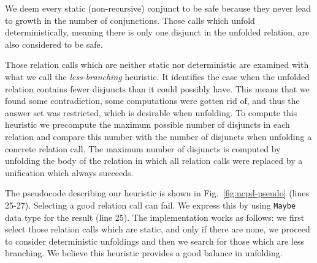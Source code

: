 We deem every static (non-recursive) conjunct to be safe because they never lead to growth in the number of conjunctions.
Those calls which unfold deterministically, meaning there is only one disjunct in the unfolded relation, are also considered to be safe.

Those relation calls which are neither static nor deterministic are examined with what we call the \emph{less-branching} heuristic.
It identifies the case when the unfolded relation contains fewer disjuncts than it could possibly have.
This means that we found some contradiction, some computations were gotten rid of, and thus the answer set was restricted, which is desirable when unfolding.
To compute this heuristic we precompute the maximum possible number of disjuncts in each relation and compare this number with the number of disjuncts when unfolding a concrete relation call.
The maximum number of disjuncts is computed by unfolding the body of the relation in which all relation calls were replaced by a unification which always succeeds.



The pseudocode describing our heuristic is shown in Fig.~\ref{fig:ncpd-pseudo} (lines 25-27).
Selecting a good relation call can fail.
We express this by using \verb!Maybe! data type for the result (line 25).
The implementation works as follows: we first select those relation calls which are static, and only if there are none, we proceed to consider deterministic unfoldings and then we search for those which are less branching.
We believe this heuristic provides a good balance in unfolding.



